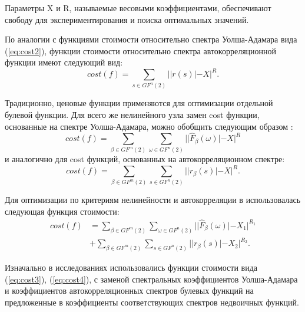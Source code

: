 Параметры X и R, называемые весовыми коэффициентами, обеспечивают свободу для
экспериментирования и поиска оптимальных значений. 

По аналогии с функциями стоимости относительно спектра Уолша-Адамара вида (\ref{eq:cost2}),
функции стоимости относительно спектра автокорреляционной функции имеют
следующий вид:
\begin{equation}\label{eq:cost3}cost(f) = \sum_{s \in GF^{n}(2)}||r(s)| - X|^R.\end{equation}

Традиционно, ценовые функции применяются для оптимизации отдельной булевой
функции. Для всего же нелинейного узла замен cost функции, основанные на спектре
Уолша-Адамара, можно обобщить следующим образом \cite{Clark1}:
\begin{equation}\label{eq:cost4}cost(f) = \sum_{\beta \in GF^{m}(2)}\sum_{\omega \in GF^{n}(2)}||\hat{F}_{\beta}(\omega)| - X|^R\end{equation}
и аналогично для cost функций, основанных на автокорреляционном спектре:
\begin{equation}\label{eq:cost5}cost(f) = \sum_{\beta \in GF^{m}(2)}\sum_{s \in GF^{n}(2)}||r_{\beta}(s)| - X|^R.\end{equation}

Для оптимизации по критериям нелинейности и автокорреляции в \cite{Kavut} использовалась
следующая функция стоимости:
\begin{equation}\label{eq:cost6}\begin{split}cost(f) &= \sum_{\beta \in GF^{m}(2)}\sum_{\omega \in GF^{n}(2)}||\hat{F}_{\beta}(\omega)| - X_1|^{R_1} \\
&+ \sum_{\beta \in GF^{m}(2)}\sum_{s \in GF^{n}(2)}||r_{\beta}(s)| - X_2|^{R_2}.\end{split}\end{equation}

Изначально в исследованиях использовались функции стоимости вида (\ref{eq:cost3}),
(\ref{eq:cost4}), с заменой спектральных коэффициентов Уолша-Адамара и
коэффициентов автокорреляционных спектров булевых функций на предложенные в \cite{Kuznetsov}
коэффициенты соответствующих спектров недвоичных функций.


